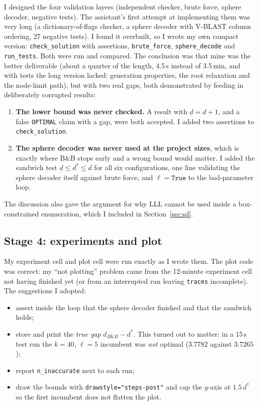 \documentclass[11pt,a4paper]{article}
\newcommand{\BB}{B\&B}
\begin{document}
I designed the four validation layers (independent checker, brute force, sphere decoder, negative tests). The assistant's first attempt at implementing them was very long (a dictionary-of-flags checker, a sphere decoder with V-BLAST column ordering, 27 negative tests). I found it overbuilt, so I wrote my own compact version: \texttt{check\_solution} with assertions, \texttt{brute\_force}, \texttt{sphere\_decode} and \texttt{run\_tests}. Both were run and compared. The conclusion was that mine was the better deliverable (about a quarter of the length, 4.5\,s instead of 3.5\,min, and with tests the long version lacked: generation properties, the root relaxation and the node-limit path), but with two real gaps, both demonstrated by feeding in deliberately corrupted results:
\begin{enumerate}
  \item \textbf{The lower bound was never checked.} A result with $\underline d=d+1$, and a false \texttt{OPTIMAL} claim with a gap, were both accepted. I added two assertions to \texttt{check\_solution}.
  \item \textbf{The sphere decoder was never used at the project sizes}, which is exactly where \BB{} stops early and a wrong bound would matter. I added the sandwich test $\underline d\le d^\ast\le d$ for all six configurations, one line validating the sphere decoder itself against brute force, and $\ell=\texttt{True}$ to the bad-parameter loop.
\end{enumerate}
The discussion also gave the argument for why LLL cannot be used inside a box-constrained enumeration, which I included in Section~\ref{sec:sd}.

\subsection{Stage 4: experiments and plot}

My experiment cell and plot cell were run exactly as I wrote them. The plot code was correct: my ``not plotting'' problem came from the 12-minute experiment cell not having finished yet (or from an interrupted run leaving \texttt{traces} incomplete). The suggestions I adopted:
\begin{itemize}
  \item assert inside the loop that the sphere decoder finished and that the sandwich holds;
  \item store and print the \emph{true gap} $d_{\BB{}}-d^\ast$. This turned out to matter: in a 15\,s test run the $k=40$, $\ell=5$ incumbent was \emph{not} optimal ($3.7782$ against $3.7265$);
  \item report \texttt{n\_inaccurate} next to each run;
  \item draw the bounds with \texttt{drawstyle="steps-post"} and cap the $y$-axis at $1.5\,d^\ast$ so the first incumbent does not flatten the plot.
\end{itemize}
\end{document}
